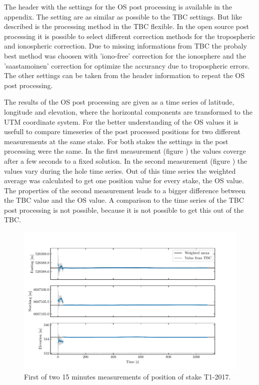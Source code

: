 The header with the settings for the OS post processing is available in the appendix.
The setting are as similar as possible to the TBC settings.
But like described is the processing method in the TBC flexible.
In the open source post processing it is possible to select different correction methods for the tropospheric and ionospheric correction. 
Due to missing informations from TBC the probaly best method was choosen with 'iono-free' correction for the ionosphere and the 'saastamoinen' correction for optimize the accurancy due to tropospheric errors. 
The other settings can be taken from the header information to repeat the OS post processing. 
\medskip

The results of the OS post processing are given as a time series of latitude, longitude and elevation, where the horizontal components are transformed to the UTM coordinate system. 
For the better understanding of the OS values it is usefull to compare timeseries of the post processed positions for two different measurements at the same stake.
For both stakes the settings in the post processing were the same.
In the first measurement (figure \label{GPS:fig:T1-i_timeseries}) the values coverge after a few seconds to a fixed solution.
In the second measurement (figure \label{GPS:fig:T1-ii_timeseries}) the values vary during the hole time series.
Out of this time series the weighted average was calculated to get one position value for every stake, the OS value.
The properties of the second measurement leads to a bigger difference between the TBC value and the OS value.
A comparison to the time series of the TBC post processing is not possible, because it is not possible to get this out of the TBC.

\begin{figure}[H]
    \centering
    \includegraphics[width=\textwidth]{./figs/timeseries/46250700_corr-T1-i-2017_Timeseries-east-north-elev.pdf}
    \caption{First of two 15 minutes measurements of position of stake T1-2017.}
    \label{GPS:fig:T1-i_timeseries}
\end{figure}

